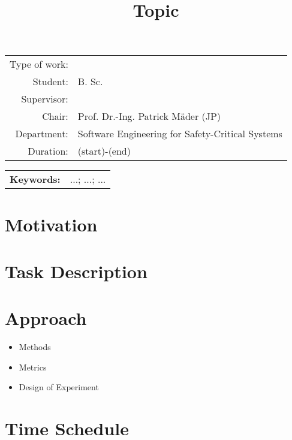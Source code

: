 \documentclass[11pt,a4paper, titlepage=false]{scrreprt}
\begin{document}
\title{Topic}
\author{}
\date{}
\maketitle
\vspace{-2cm}
\begin{tabular}{r l}
Type of work: & \\%
Student: & B.  Sc. \\
Supervisor: & \\
Chair: & Prof. Dr.-Ing. Patrick Mäder (JP)\\
Department: & Software Engineering for Safety-Critical Systems\\
Duration: & (start)-(end)\\
\end{tabular}

\vspace{3mm}

\begin{tabular}{l p{}}
\\
\textbf{Keywords:} & ...; ...; ... \\ %
\end{tabular}

\vspace{8mm}

\section*{Motivation}
\lipsum[2]

\section*{Task Description}
\lipsum[2-4]

\section*{Approach}
\begin{itemize}
	\item Methods
	\item Metrics
	\item Design of Experiment
\end{itemize}
\lipsum[5-8]


\section*{Time Schedule}
\end{document}
